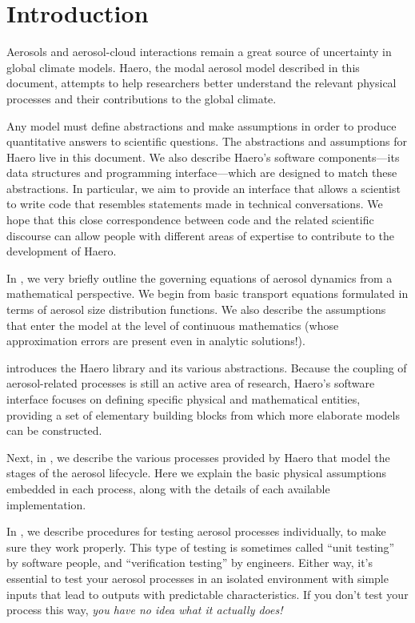 \chapter{Introduction}

Aerosols and aerosol-cloud interactions remain a great source of uncertainty
in global climate models. Haero, the modal aerosol model described in this
document, attempts to help researchers better understand the relevant physical
processes and their contributions to the global climate.

Any model must define abstractions and make assumptions in order to produce
quantitative answers to scientific questions. The abstractions and assumptions
for Haero live in this document. We also describe Haero's software
components---its data structures and programming interface---which are designed
to match these abstractions. In particular, we aim to provide an interface that
allows a scientist to write code that resembles statements made in technical
conversations. We hope that this close correspondence between code and
the related scientific discourse can allow people with different areas of
expertise to contribute to the development of Haero.

In , we very briefly outline the governing equations of
aerosol dynamics from a mathematical perspective. We begin from basic transport
equations formulated in terms of aerosol size distribution functions. We also
describe the assumptions that enter the model at the level of continuous
mathematics (whose approximation errors are present even in analytic
solutions!).

 introduces the Haero library and its various abstractions.
Because the coupling of aerosol-related processes is still an active area of
research, Haero's software interface focuses on defining specific physical and
mathematical entities, providing a set of elementary building blocks from which
more elaborate models can be constructed.

Next, in , we describe the various processes provided by
Haero that model the stages of the aerosol lifecycle. Here we explain the basic
physical assumptions embedded in each process, along with the details of each
available implementation.

In , we describe procedures for testing aerosol processes
individually, to make sure they work properly. This type of testing is sometimes
called ``unit testing'' by software people, and ``verification testing'' by
engineers. Either way, it's essential to test your aerosol processes in an
isolated environment with simple inputs that lead to outputs with predictable
characteristics. If you don't test your process this way, {\em you have no idea
what it actually does!}

